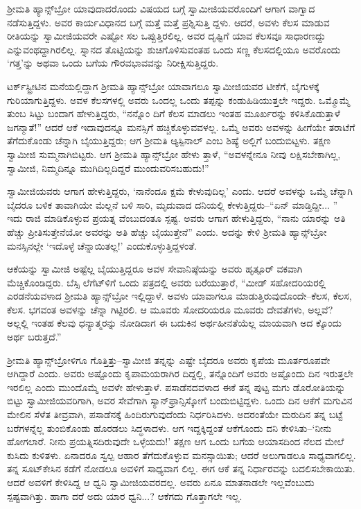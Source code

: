 ಶ್ರೀಮತಿ ಹ್ಯಾನ್ಸ್​ಬ್ರೋ ಯಾವುದಾದರೊಂದು ವಿಷಯದ ಬಗ್ಗೆ ಸ್ವಾಮೀಜಿಯವರೊಂದಿಗೆ ಆಗಾಗ ವಾಗ್ವಾದ ನಡೆಸುತ್ತಿದ್ದಳು. ಅವರ ಕಾರ್ಯವಿಧಾನದ ಬಗ್ಗೆ ಮತ್ತೆ ಮತ್ತೆ ಪ್ರಶ್ನಿಸುತ್ತಿ ದ್ದಳು. ಆದರೆ, ಅವಳು ಕೆಲಸ ಮಾಡುವ ರೀತಿಯನ್ನು ಸ್ವಾಮೀಜಿಯವರೇ ಎಷ್ಟೋ ಸಲ ಒಪ್ಪುತ್ತಿರಲಿಲ್ಲ. ಅವರ ದೃಷ್ಟಿಗೆ ಯಾವ ಕೆಲಸವೂ ಸಾಧಾರಣದ್ದು ಎನ್ನುವಂಥದ್ದಾಗಿರಲಿಲ್ಲ. ಸ್ನಾನದ ತೊಟ್ಟಿಯನ್ನು ಶುಚಿಗೊಳಿಸುವಂತಹ ಒಂದು ಸಣ್ಣ ಕೆಲಸದಲ್ಲಿಯೂ ಅವರೊಂದು ‘ಗತ್ತ’ನ್ನು ಅಥವಾ ಒಂದು ಬಗೆಯ ಗೌರವಭಾವವನ್ನು ನಿರೀಕ್ಷಿಸುತ್ತಿದ್ದರು.

ಟರ್ಕ್​ಸ್ಟ್ರೀಟಿನ ಮನೆಯಲ್ಲಿದ್ದಾಗ ಶ್ರೀಮತಿ ಹ್ಯಾನ್ಸ್​ಬ್ರೋ ಯಾವಾಗಲೂ ಸ್ವಾಮೀಜಿಯವರ ಟೀಕೆಗೆ, ಬೈಗುಳಕ್ಕೆ ಗುರಿಯಾಗುತ್ತಿದ್ದಳು. ಅವಳ ಕೆಲಸಗಳಲ್ಲಿ ಅವರು ಒಂದಲ್ಲ ಒಂದು ತಪ್ಪನ್ನು ಕಂಡುಹಿಡಿಯುತ್ತಲೇ ಇದ್ದರು. ಒಮ್ಮೊಮ್ಮೆ ತುಂಬ ಸಿಟ್ಟು ಬಂದಾಗ ಹೇಳುತ್ತಿದ್ದರು, “ನನ್ನೊಂ ದಿಗೆ ಕೆಲಸ ಮಾಡಲು ಇಂತಹ ಮೂರ್ಖರನ್ನು ಕಳಿಸಿಕೊಡುತ್ತಾಳೆ ಜಗನ್ಮಾತೆ!” ಆದರೆ ಆಕೆ ಇದಾವುದನ್ನೂ ಮನಸ್ಸಿಗೆ ಹಚ್ಚಿಕೊಳ್ಳುವವಳಲ್ಲ. ಒಮ್ಮೆ ಅವರು ಅವಳನ್ನು ಹೀಗೆಯೇ ತರಾಟೆಗೆ ತೆಗೆದುಕೊಂಡು ಚೆನ್ನಾಗಿ ಬೈಯುತ್ತಿದ್ದರು; ಆಗ ಶ್ರೀಮತಿ ಆ್ಯಸ್ಪಿನಾಲ್ ಎಂಬ ಶಿಷ್ಯೆ ಅಲ್ಲಿಗೆ ಬಂದುಬಿಟ್ಟಳು. ತಕ್ಷಣ ಸ್ವಾಮೀಜಿ ಸುಮ್ಮನಾಗಿಬಿಟ್ಟರು. ಆಗ ಶ್ರೀಮತಿ ಹ್ಯಾನ್ಸ್​ಬ್ರೋ ಹೇಳು ತ್ತಾಳೆ, “ಅವಳನ್ನೇನೂ ನೀವು ಲಕ್ಷಿಸಬೇಕಾಗಿಲ್ಲ, ಸ್ವಾಮೀಜಿ, ನಿಮ್ಮದಿನ್ನೂ ಮುಗಿದಿಲ್ಲದಿದ್ದರೆ ಮುಂದುವರಿಸಬಹುದು!”

ಸ್ವಾಮೀಜಿಯವರು ಆಗಾಗ ಹೇಳುತ್ತಿದ್ದರು, ‘ನಾನೆಂದೂ ಕ್ಷಮೆ ಕೇಳುವುದಿಲ್ಲ’ ಎಂದು. ಆದರೆ ಅವಳನ್ನು ಒಮ್ಮೆ ಚೆನ್ನಾಗಿ ಬೈದರೂ ಬಳಿಕ ತಾವಾಗಿಯೇ ಮೆಲ್ಲನೆ ಬಳಿ ಸಾರಿ, ಮೃದುವಾದ ದನಿಯಲ್ಲಿ ಕೇಳುತ್ತಿದ್ದರು–“ಏನ್ ಮಾಡ್ತಿದ್ದೀ... ” ಇದು ರಾಜಿ ಮಾಡಿಕೊಳ್ಳುವ ಪ್ರಯತ್ನ ವೆಂಬುದಂತೂ ಸ್ಪಷ್ಟ. ಅವರು ಆಗಾಗ ಹೇಳುತ್ತಿದ್ದರು, “ನಾನು ಯಾರನ್ನು ಅತಿ ಹೆಚ್ಚು ಪ್ರೀತಿಸುತ್ತೇನೆಯೋ ಅವರನ್ನು ಅತಿ ಹೆಚ್ಚು ಬೈಯುತ್ತೇನೆ” ಎಂದು. ಅದನ್ನು ಕೇಳಿ ಶ್ರೀಮತಿ ಹ್ಯಾನ್ಸ್​ಬ್ರೋ ಮನಸ್ಸಿನಲ್ಲೇ ‘ಇದೊಳ್ಳೆ ಚೆನ್ನಾಯಿತಲ್ಲ!’ ಎಂದುಕೊಳ್ಳುತ್ತಿದ್ದಳಂತೆ.

ಆಕೆಯನ್ನು ಸ್ವಾಮೀಜಿ ಅಷ್ಟೆಲ್ಲ ಬೈಯುತ್ತಿದ್ದರೂ ಅವಳ ಸೇವಾನಿಷ್ಠೆಯನ್ನು ಅವರು ಹೃತ್ಪೂರ್ ವಕವಾಗಿ ಮೆಚ್ಚಿಕೊಂಡಿದ್ದರು. ಬೆಸ್ಸಿ ಲೆಗೆಟ್​ಳಿಗೆ ಒಂದು ಪತ್ರದಲ್ಲಿ ಅವರು ಬರೆಯುತ್ತಾರೆ, “ಮೀಡ್ ಸಹೋದರಿಯರಲ್ಲಿ ಎರಡನೆಯವಳಾದ ಶ್ರೀಮತಿ ಹ್ಯಾನ್ಸ್​ಬ್ರೋ ಇಲ್ಲಿದ್ದಾಳೆ. ಅವಳು ಯಾವಾಗಲೂ ಮಾಡುತ್ತಿರುವುದೊಂದೇ–ಕೆಲಸ, ಕೆಲಸ, ಕೆಲಸ. ಭಗವಂತ ಅವಳನ್ನು ಚೆನ್ನಾ ಗಿಟ್ಟಿರಲಿ. ಆ ಮೂವರು ಸೋದರಿಯರೂ ಮೂವರು ದೇವತೆಗಳು, ಅಲ್ಲವೆ? ಅಲ್ಲಲ್ಲಿ ಇಂತಹ ಕೆಲವು ಧನ್ಯಾತ್ಮರನ್ನು ನೋಡಿದಾಗ ಈ ಬದುಕಿನ ಅರ್ಥಹೀನತೆಯೆಲ್ಲ ಮಾಯವಾಗಿ ಅದ ಕ್ಕೊಂದು ಅರ್ಥ ಬರುತ್ತದೆ.”

ಶ್ರೀಮತಿ ಹ್ಯಾನ್ಸ್​ಬ್ರೋಳಿಗೂ ಗೊತ್ತಿತ್ತು–ಸ್ವಾಮೀಜಿ ತನ್ನನ್ನು ಎಷ್ಟೇ ಬೈದರೂ ಅವರು ಕೃಪೆಯ ಮೂರ್ತರೂಪವೇ ಆಗಿದ್ದಾರೆ ಎಂದು. ಅವರು ಅಷ್ಟೊಂದು ಕೃಪಾಮಯರಾಗಿರ ದಿದ್ದಲ್ಲಿ, ತನ್ನೊಂದಿಗೆ ಅವರು ಅಷ್ಟೊಂದು ದಿನ ಇರುತ್ತಲೇ ಇರಲಿಲ್ಲ ಎಂದು ಮುಂದೊಮ್ಮೆ ಅವಳೇ ಹೇಳುತ್ತಾಳೆ. ಪಸಾಡೆನದವಳಾದ ಈಕೆ ತನ್ನ ಪುಟ್ಟ ಮಗು ಡೊರೋತಿಯನ್ನು ಬಿಟ್ಟು ಸ್ವಾಮೀಜಿಯವರಿಗಾಗಿ, ಅವರ ಸೇವೆಗಾಗಿ ಸ್ಯಾನ್​ಫ್ರಾನ್ಸಿಸ್ಕೋಗೆ ಬಂದುಬಿಟ್ಟಿದ್ದಳು. ಒಂದು ದಿನ ಆಕೆಗೆ ಮಗುವಿನ ಮೇಲಿನ ಸೆಳೆತ ತೀವ್ರವಾಗಿ, ಪಸಾಡೆನಕ್ಕೆ ಹಿಂದಿರುಗುವುದೆಂದು ನಿರ್ಧರಿಸಿದಳು. ಅದರಂತೆಯೇ ಮರುದಿನ ತನ್ನ ಬಟ್ಟೆ ಬರೆಗಳನ್ನೆಲ್ಲ ತುಂಬಿಕೊಂಡು ಹೊರಡಲು ಸಿದ್ಧಳಾದಳು. ಆಗ ಇದ್ದಕ್ಕಿದ್ದಂತೆ ಆಕೆಗೊಂದು ದನಿ ಕೇಳಿಸಿತು–‘ನೀನು ಹೋಗಲಾರೆ. ನೀನು ಪ್ರಯತ್ನಿಸದಿರುವುದೇ ಒಳ್ಳೆಯದು!’ ತಕ್ಷಣ ಆಗ ಒಂದು ಬಗೆಯ ಆಯಾಸದಿಂದ ನೆಲದ ಮೇಲೆ ಕುಸಿದು ಕುಳಿತಳು. ಏನಾದರೂ ಸ್ವಲ್ಪ ಆಹಾರ ತೆಗೆದುಕೊಳ್ಳುವ ಮನಸ್ಸಾಯಿತು; ಆದರೆ ಅಲುಗಾಡಲೂ ಸಾಧ್ಯವಾಗಲಿಲ್ಲ. ತನ್ನ ಸೂಟ್​ಕೇಸಿನ ಕಡೆಗೆ ನೋಡಲೂ ಅವಳಿಗೆ ಸಾಧ್ಯವಾಗ ಲಿಲ್ಲ. ಈಗ ಆಕೆ ತನ್ನ ನಿರ್ಧಾರವನ್ನು ಬದಲಿಸಬೇಕಾಯಿತು. ಆದರೆ ಅವಳಿಗೆ ಕೇಳಿಸಿದ್ದ ಆ ಧ್ವನಿ ಸ್ವಾಮೀಜಿಯವರದಲ್ಲ. ಅವರು ಏನೂ ಮಾತನಾಡಲೇ ಇಲ್ಲವೆಂಬುದು ಸ್ಪಷ್ಟವಾಗಿತ್ತು. ಹಾಗಾ ದರೆ ಅದು ಯಾರ ಧ್ವನಿ...? ಆಕೆಗದು ಗೊತ್ತಾಗಲೇ ಇಲ್ಲ.

